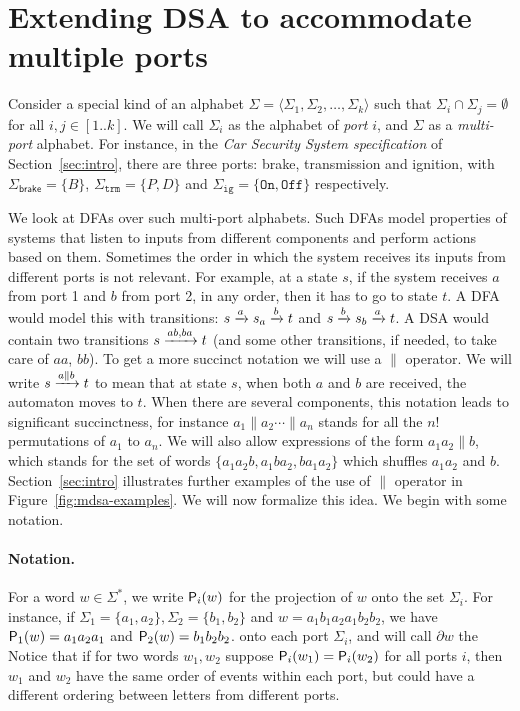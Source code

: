 \section{Extending DSA to accommodate multiple ports}

Consider a special kind of an alphabet
$\Sigma = \langle \Sigma_1, \Sigma_2, \dots, \Sigma_k \rangle$ such
that $\Sigma_i \cap \Sigma_j = \emptyset$ for all $i, j \in
[1..k]$. We will call $\Sigma_i$ as the alphabet of \emph{port} $i$,
and $\Sigma$ as a \emph{multi-port} alphabet. For instance, in the \emph{Car Security System specification} of Section~\ref{sec:intro}, there are three ports: brake, transmission and ignition, with $\Sigma_{\mathsf{brake}} = \{B\}$, $\Sigma_{\mathtt{trm}} = \{ P, D\}$ and $\Sigma_{\mathtt{ig}} = \{ \mathtt{On}, \mathtt{Off} \}$ respectively.  

We look at DFAs over such multi-port alphabets. Such DFAs model properties of systems 
that listen to inputs from different components and perform actions
based on them. Sometimes the order in which the system receives its
inputs from different ports is not relevant. For example, at a state
$s$, if the system receives $a$ from port 1 and $b$ from port 2, in any
order, then it has to go to state $t$.  A DFA would model this with
transitions: $s \xrightarrow{a} s_a \xrightarrow{b} t$ and $s \xrightarrow{b} s_b \xrightarrow{a}
t$. A DSA would contain two transitions $s \xrightarrow{ab, ba} t$ (and some
other transitions, if needed, to take care of $aa$, $bb$). To get a
more succinct notation we will use a $\parallel$ operator. We will
write $s \xrightarrow{a \parallel b} t$ to mean that at state $s$, when
both $a$ and $b$ are received, the automaton moves to $t$. When there
are several components, this notation leads to significant
succinctness, for instance $a_1 \parallel a_2 \cdots \parallel a_n$
stands for all the $n!$ permutations of $a_1$ to $a_n$. We will also
allow expressions of the form $a_1 a_2 \parallel b$, which stands for
the set of words $\{a_1 a_2 b, a_1 b a_2, b a_1 a_2\}$ which shuffles
$a_1a_2$ and $b$. Section~\ref{sec:intro} illustrates further examples of the use of $\parallel$ operator in Figure~\ref{fig:mdsa-examples}. We will now formalize this idea.  We begin with some notation.%

\paragraph*{Notation.} For a word $w \in \Sigma^*$, we write
$\mathsf{P}_{i}(w)$ for the projection of $w$ onto the set $\Sigma_i$. For
instance, if $\Sigma_1 = \{a_1, a_2\}, \Sigma_2 = \{b_1, b_2\}$ and
$w = a_1 b_1 a_2 a_1 b_2 b_2$, we have $\mathsf{P}_{1}(w) = a_1 a_2 a_1$ and
$\mathsf{P}_{2}(w) = b_1 b_2 b_2$.  %
onto each port $\Sigma_i$, and will call $\partial w$ the
Notice that if for two words $w_1, w_2$ suppose $\mathsf{P}_{i}(w_1) = \mathsf{P}_{i}(w_2)$ for all ports $i$, then $w_1$ and $w_2$ have the same order of events within each port, but could have a different ordering between letters from different ports.%


